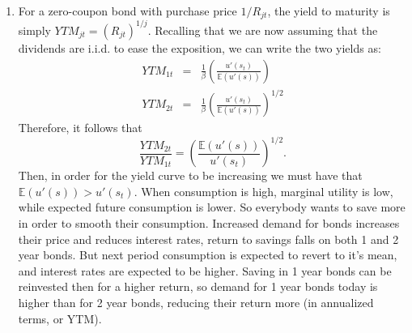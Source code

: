 \documentclass{article}
\begin{document}
{\begin{enumerate}
The last part of this question asks us to evaluate whether a reasonable
replication result holds. But as we will see, the combination of risk
aversion and uncertainty in this model will actually make this equation
not hold. In order to see this, we can compute:
\begin{eqnarray*}
q_{2t} & = & \mathbb{E}_{t}\left[\beta\frac{u'(s_{t+1})}{u'(s_{t})}q_{1,t+1}\right] \\
 & = & \mathbb{E}_{t}\left[\beta\frac{u'(s_{t+1})}{u'(s_{t})}\right]\mathbb{E}_{t}\left[q_{1,t+1}\right]+Cov_{t}\left(\beta\frac{u'(s_{t+1})}{u'(s_{t})},q_{1,t+1}\right) \\
 & = & q_{1t}\mathbb{E}_{t}\left[q_{1,t+1}\right]+Cov_{t}\left(\beta\frac{u'(s_{t+1})}{u'(s_{t})},q_{1,t+1}\right)\ne q_{1t}\mathbb{E}_{t}\left[q_{1,t+1}\right]\text{ in general. }
\end{eqnarray*}
Note that under risk neutrality, i.e. linear utility, marginal utility
is constant and so the covariance term goes away and the originally
proposed result holds.


\item For a zero-coupon bond with purchase price $1/R_{jt}$, the yield
to maturity is simply $YTM_{jt}=(R_{jt})^{1/j}$. Recalling that we
are now assuming that the dividends are i.i.d. to ease the exposition,
we can write the two yields as:
\begin{eqnarray*}
YTM_{1t} & = & \frac{1}{\beta}\left(\frac{u'(s_{t})}{\mathbb{E}(u'(s))}\right)\\
YTM_{2t} & = & \frac{1}{\beta}\left(\frac{u'(s_{t})}{\mathbb{E}(u'(s))}\right)^{1/2}
\end{eqnarray*}
Therefore, it follows that
\begin{equation*}
\frac{YTM_{2t}}{YTM_{1t}}=\left(\frac{\mathbb{E}(u'(s))}{u'(s_{t})}\right)^{1/2}.
\end{equation*}
Then, in order for the yield curve to be increasing we must have that
$\mathbb{E}(u'(s))>u'(s_{t})$. When consumption is high, marginal
utility is low, while expected future consumption is lower. So
everybody wants to save more in order to smooth their
consumption. Increased demand for bonds increases their price and
reduces interest rates, return to savings falls on both 1 and 2 year
bonds. But next period consumption is expected to revert to it's mean,
and interest rates are expected to be higher. Saving in 1 year bonds
can be reinvested then for a higher return, so demand for 1 year bonds
today is higher than for 2 year bonds, reducing their return more (in
annualized terms, or YTM).



\end{enumerate}}
\end{document}
